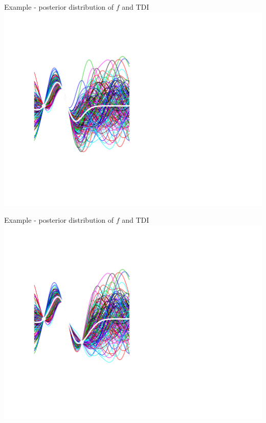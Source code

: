 \documentclass[ignorenonframetext,xcolor=pdflatex,table,dvipsnames,serif]{beamer}
\begin{document}
\begin{frame}{Example - posterior distribution of $f$ and TDI}
  \center\includegraphics[scale=0.5]{probAni03}
\end{frame}

\begin{frame}{Example - posterior distribution of $f$ and TDI}
  \center\includegraphics[scale=0.5]{probAni04}
\end{frame}
\end{document}
